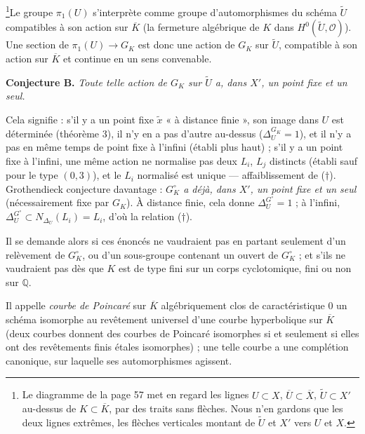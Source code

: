 \documentclass[11pt,a4paper]{article}
\begin{document}

\footnote{Le diagramme de la page 57 met en regard les lignes $U \subset X$,
$\overline{U} \subset \overline{X}$, $\widetilde{U} \subset X'$ au-dessus de $K
\subset \overline{K}$, par des traits sans flèches. Nous n'en gardons que les
deux lignes extrêmes, les flèches verticales montant de $\widetilde{U}$ et $X'$
vers $U$ et $X$.}Le groupe $\pi_1(U)$ s'interprète comme groupe
d'automorphismes du schéma $\widetilde{U}$ compatibles à son action sur
$\overline{K}$ (la fermeture algébrique de $K$ dans $H^0(\widetilde{U},
\mathcal{O})$). Une section de $\pi_1(U) \to G_K$ est donc une action de
$G_K$ sur $\widetilde{U}$, compatible à son action sur $\overline{K}$ et
continue en un sens convenable.

\textbf{Conjecture B.} \emph{Toute telle action de $G_K$ sur
$\widetilde{U}$ a, dans $X'$, un point fixe et un seul.}

Cela signifie : s'il y a un point fixe $\tilde x$ « à distance finie », son
image dans $U$ est déterminée (théorème 3), il n'y en a pas d'autre au-dessus
($\Delta_U^{G_K} = 1$), et il n'y a pas en même temps de point fixe à l'infini
(établi plus haut) ; s'il y a un point fixe à l'infini, une même action ne
normalise pas deux $L_i$, $L_j$ distincts (établi sauf pour le type $(0,3)$), et
le $L_i$ normalisé est unique — affaiblissement de ($\dagger$). Grothendieck
conjecture davantage : \emph{$G_K^{\circ}$ a déjà, dans $X'$, un point fixe et
un seul} (nécessairement fixe par $G_K$). À distance finie, cela donne
$\Delta_U^{G^{\circ}} = 1$ ; à l'infini, $\Delta_U^{G^{\circ}} \subset
N_{\Delta_U}(L_i) = L_i$, d'où la relation ($\dagger$).

Il se demande alors si ces énoncés ne vaudraient pas en partant seulement
d'un relèvement de $G_K^{\circ}$, ou d'un sous-groupe contenant un ouvert de
$G_K^{\circ}$ ; et s'ils ne vaudraient pas dès que $K$ est de type fini sur un
corps cyclotomique, fini ou non sur $\mathbb{Q}$.

Il appelle \emph{courbe de Poincaré} sur $\overline{K}$ algébriquement clos de
caractéristique $0$ un schéma isomorphe au revêtement universel d'une courbe
hyperbolique sur $\overline{K}$ (deux courbes donnent des courbes de Poincaré
isomorphes si et seulement si elles ont des revêtements finis étales
isomorphes) ; une telle courbe a une complétion canonique, sur laquelle ses
automorphismes agissent.
\end{document}
